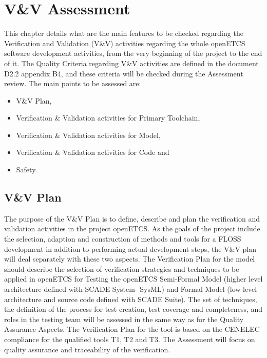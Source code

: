 \documentclass[openetcs]{template/openetcs_article}
\begin{document}
\section{V\&V Assessment}
This chapter details what are the main features to be checked regarding the Verification and Validation (V\&V) activities regarding the whole openETCS software
development activities, from the very beginning of the project to the end of it.
The Quality Criteria regarding V\&V activities are defined in the document D2.2 appendix B4, and these criteria will be checked during the Assessment
review. The main points to be assessed are:
\begin{itemize}
\item V\&V Plan,
\item Verification \& Validation activities for Primary Toolchain,
\item Verification \& Validation activities for Model,
\item Verification \& Validation activities for Code and
\item Safety.
\end{itemize}

\subsection{V\&V Plan}
The purpose of the V\&V Plan is to define, describe and plan the verification and validation activities in the project openETCS. As the goals of the project
include the selection, adaption and construction of methods and tools for a FLOSS development in addition to performing actual development steps, the V\&V plan
will deal separately with these two aspects.
The Verification Plan for the model should describe the selection of verification strategies and techniques to be applied in openETCS for Testing the openETCS Semi-Formal Model (higher level architecture defined with SCADE System- SysML) and Formal Model (low level architecture and source code defined with SCADE Suite). The set of techniques, the definition of the process for test creation, test coverage and completeness, and roles in
the testing team will be assessed in the same way as for the Quality Assurance Aspects.
The Verification Plan for the tool is based on the CENELEC compliance for the qualified tools T1, T2 and T3. The Assessment will focus on quality assurance and
traceability of the verification.
\end{document}
